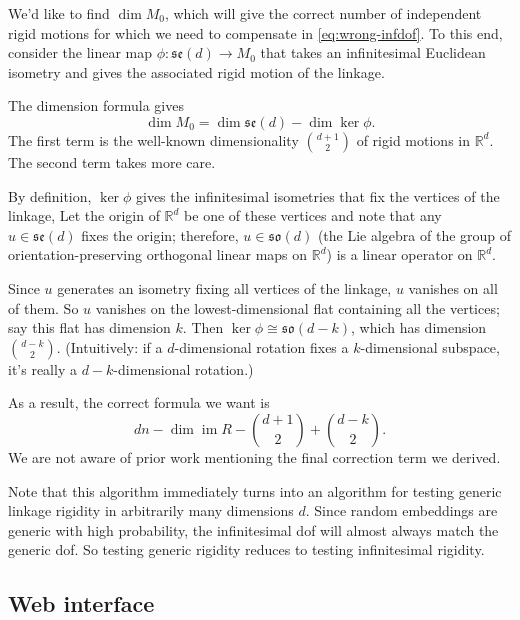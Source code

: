 \documentclass[aps,prd,final,twocolumn,letterpaper,nofootinbib]{revtex4-1}
\newcommand\RR{\mathbb{R}}
\DeclareMathOperator\im{im}
\begin{document}
We'd like to find $\dim M_0$,
which will give the correct number of independent rigid motions
for which we need to compensate in \cref{eq:wrong-infdof}.
To this end,
consider the linear map $\phi\colon\mathfrak{se}(d) \to M_0$
that takes an infinitesimal Euclidean isometry
and gives the associated rigid motion of the linkage.

The dimension formula gives
\[
    \dim M_0 = \dim\mathfrak{se}(d) - \dim\ker\phi.
\]
The first term is the well-known dimensionality $\binom{d+1}{2}$
of rigid motions in $\RR^d$.
The second term takes more care.

By definition, $\ker\phi$ gives the infinitesimal isometries
that fix the vertices of the linkage,
Let the origin of $\RR^d$ be one of these vertices
and note that any $u\in \mathfrak{se}(d)$ fixes the origin;
therefore, $u\in\mathfrak{so}(d)$
(the Lie algebra of the group
of orientation-preserving orthogonal linear maps on $\RR^d$)
is a linear operator on $\RR^d$.

Since $u$ generates an isometry fixing all vertices of the linkage,
$u$ vanishes on all of them.
So $u$ vanishes on the lowest-dimensional flat containing all the vertices;
say this flat has dimension $k$.
Then $\ker\phi\cong\mathfrak{so}(d-k)$, which has dimension $\binom{d-k}{2}$.
(Intuitively: if a $d$-dimensional rotation fixes a $k$-dimensional subspace,
it's really a $d-k$-dimensional rotation.)

As a result, the correct formula we want is
\begin{equation}
    dn - \dim\im R - \binom{d+1}{2} + \binom{d-k}{2}.
\end{equation}
We are not aware of prior work mentioning the final correction term we derived.

Note that this algorithm immediately turns into an algorithm
for testing generic linkage rigidity in arbitrarily many dimensions $d$.
Since random embeddings are generic with high probability,
the infinitesimal dof will almost always match the generic dof.
So testing generic rigidity reduces to testing infinitesimal rigidity.

\subsection{Web interface}
\end{document}
